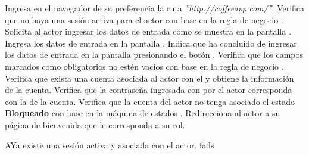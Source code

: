 	\begin{UCtrayectoria}
		\UCpaso[\UCactor] Ingresa en el navegador de su preferencia la ruta \textit{''http://coffeeapp.com/''}.
		\UCpaso Verifica que no haya una sesión activa para el actor con base en la regla de negocio .
		\UCpaso Solicita al actor ingresar los datos de entrada como se muestra en la pantalla .
		\UCpaso[\UCactor] Ingresa los datos de entrada en la pantalla .
		\UCpaso[\UCactor] Indica que ha concluido de ingresar los datos de entrada en la pantalla  presionando el botón .
		\UCpaso Verifica que los campos marcados como obligatorios no estén vacíos con base en la regla de negocio .
		\UCpaso Verifica que exista una cuenta asociada al actor con el  y obtiene la información de la cuenta.
		\UCpaso Verifica que la contraseña ingresada con por el actor corresponda con la  de la cuenta.
		\UCpaso Verifica que la cuenta del actor no tenga asociado el estado \textbf{Bloqueado} con base en la máquina de estados .
		\UCpaso Redirecciona al actor a su página de bienvenida que le corresponda a su rol.	\end{UCtrayectoria}
	

	\begin{UCtrayectoriaA}{A}{Ya existe una sesión activa y asociada con el actor.}
		\UCpaso fads
	
	\end{UCtrayectoriaA}